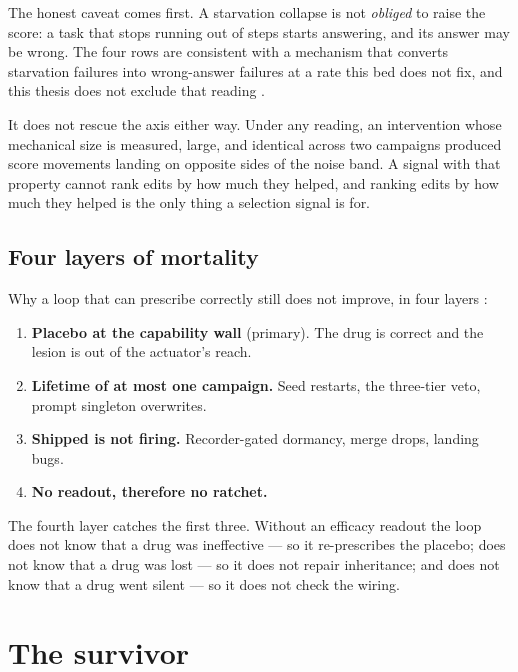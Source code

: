 The honest caveat comes first. A starvation collapse is not \emph{obliged}
to raise the score: a task that stops running out of steps starts
answering, and its answer may be wrong. The four rows are consistent with a
mechanism that converts starvation failures into wrong-answer failures at a
rate this bed does not fix, and this thesis does not exclude that reading
.

It does not rescue the axis either way. Under any reading, an intervention
whose mechanical size is measured, large, and identical across two
campaigns produced score movements landing on opposite sides of the noise
band. A signal with that property cannot rank edits by how much they
helped, and ranking edits by how much they helped is the only thing a
selection signal is for.

\subsection*{Four layers of mortality} 

Why a loop that can prescribe correctly still does not improve, in four
layers :

\begin{enumerate}
  \item \textbf{Placebo at the capability wall} (primary). The drug is
        correct and the lesion is out of the actuator's reach.
  \item \textbf{Lifetime of at most one campaign.} Seed restarts, the
        three-tier veto, prompt singleton overwrites.
  \item \textbf{Shipped is not firing.} Recorder-gated dormancy, merge
        drops, landing bugs.
  \item \textbf{No readout, therefore no ratchet.}
\end{enumerate}

The fourth layer catches the first three. Without an efficacy readout the
loop does not know that a drug was ineffective --- so it re-prescribes the
placebo; does not know that a drug was lost --- so it does not repair
inheritance; and does not know that a drug went silent --- so it does not
check the wiring.

\section{The survivor}
\label{sec:survivor}

